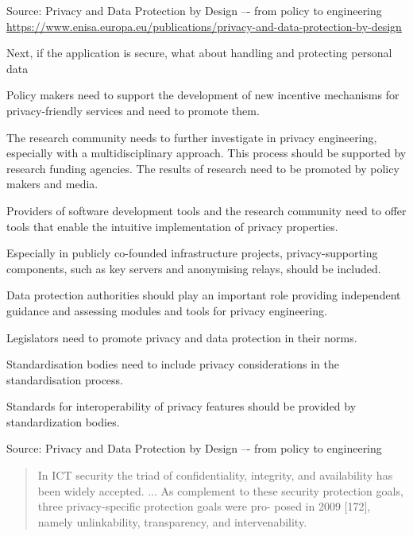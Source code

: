 \documentclass[Screen16to9,17pt]{foils}
\begin{document}
Source: Privacy and Data Protection by Design –- from policy to engineering\\
{\footnotesize\url{https://www.enisa.europa.eu/publications/privacy-and-data-protection-by-design}}

\begin{list2}
\item Next, if the application is secure, what about handling and protecting personal data
\end{list2}


\begin{list2}
\item {\small Policy makers need to support the development of new incentive mechanisms for privacy-friendly services and need to promote them.}
\item {\small The research community needs to further investigate in privacy engineering, especially with a
multidisciplinary approach. This process should be supported by research funding agencies.
The results of research need to be promoted by policy makers and media.}
\item {\small Providers of software development tools and the research community need to offer tools that
enable the intuitive implementation of privacy properties.}
\item {\small Especially in publicly co-founded infrastructure projects, privacy-supporting components,
such as key servers and anonymising relays, should be included.}
\item {\small Data protection authorities should play an important role providing independent guidance
and assessing modules and tools for privacy engineering.}
\item {\small Legislators need to promote privacy and data protection in their norms.}
\item {\small Standardisation bodies need to include privacy considerations in the standardisation process.}
\item {\small Standards for interoperability of privacy features should be provided by standardization bodies.}
\end{list2}

Source: Privacy and Data Protection by Design –- from policy to engineering\


\begin{quote}\footnotesize
In ICT
security the triad of confidentiality, integrity, and availability has been widely accepted. ...
As complement to these security protection goals, three privacy-specific protection goals were pro-
posed in 2009 [172], namely unlinkability, transparency, and intervenability.
\end{quote}
\end{document}

